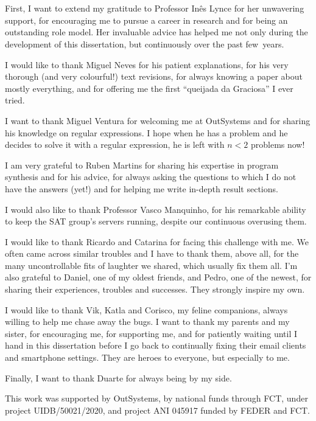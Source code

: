 \section*{\acknowledgments}


First, I want to extend my gratitude to Professor Inês Lynce for her unwavering support, for encouraging me to pursue a career in research and for being an outstanding role model. Her invaluable advice has helped me not only during the development of this dissertation, but continuously over the past few~years.

I would like to thank Miguel Neves for his patient explanations, for his very thorough (and very colourful!) text revisions, for always knowing a paper about mostly everything, and for offering me the first “queijada da Graciosa” I ever tried.

I want to thank Miguel Ventura for welcoming me at OutSystems and for sharing his knowledge on regular expressions. I hope when he has a problem and he decides to solve it with a regular expression, he is left with \(n < 2\) problems now!

I am very grateful to Ruben Martins for sharing his expertise in program synthesis and for his advice, for always asking the questions to which I do not have the answers (yet!) and for helping me write in-depth result sections.

I would also like to thank Professor Vasco Manquinho, for his remarkable ability to keep the SAT group's servers running, despite our continuous overusing them.

I would like to thank Ricardo and Catarina for facing this challenge with me. We often came across similar troubles and I have to thank them, above all, for the many uncontrollable fits of laughter we shared, which usually fix them all.
%
I'm also grateful to Daniel, one of my oldest friends, and Pedro, one of the newest, for sharing their experiences, troubles and successes. They strongly inspire my own.

I would like to thank Vik, Katla and Corisco, my feline companions, always willing to help me chase away the bugs.
%
I want to thank my parents and my sister, for encouraging me, for supporting me, and for patiently waiting until I hand in this dissertation before I go back to continually fixing their email clients and smartphone settings.  They are heroes to everyone, but especially to me.

Finally, I want to thank Duarte for always being by my side.

\bigskip
This work was supported by OutSystems, by national funds through FCT, under project UIDB/50021/2020, and project ANI 045917 funded by FEDER and FCT.

\cleardoublepage